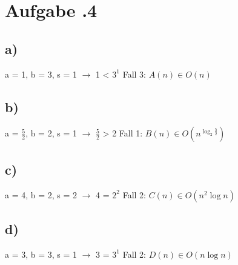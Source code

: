 \newpage
\section*{Aufgabe \bn.4}
\subsection*{a)}
a = 1, b = 3, s = 1 $\rightarrow$ 1 < $3^1$ Fall 3: $A(n)\in O(n)$
\subsection*{b)}
a = $\frac{ 5 }{ 2 } $, b = 2, s = 1 $\rightarrow$ $\frac{ 5 }{ 2 } $ > 2 Fall 1: $B(n)\in O(n^{\log_{2}\frac{ 5 }{ 2 } })$
\subsection*{c)}
a = 4, b = 2, s = 2 $\rightarrow$ 4 = $2^2$ Fall 2: $C(n)\in O(n^2\log n)$
\subsection*{d)}
a = 3, b = 3, s = 1 $\rightarrow$ 3 = $3^1$ Fall 2: $D(n)\in O(n\log n)$